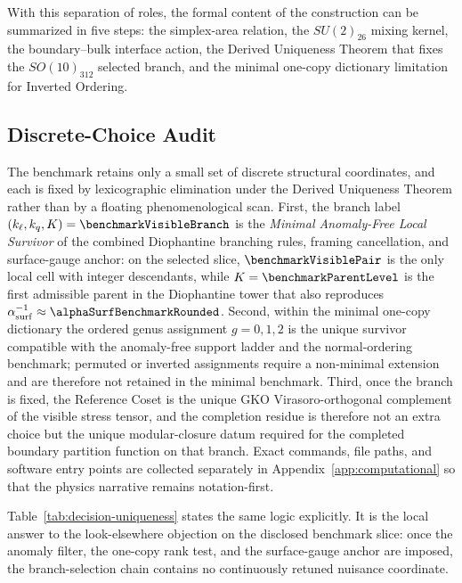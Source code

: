 \documentclass[11pt]{article}
\begin{document}
With this separation of roles, the formal content of the construction can be summarized in five steps: the simplex-area relation, the $SU(2)_{26}$ mixing kernel, the boundary--bulk interface action, the Derived Uniqueness Theorem that fixes the $SO(10)_{312}$ selected branch, and the minimal one-copy dictionary limitation for Inverted Ordering.

\subsection*{Discrete-Choice Audit}

The benchmark retains only a small set of discrete structural coordinates, and each is fixed by lexicographic elimination under the Derived Uniqueness Theorem rather than by a floating phenomenological scan. First, the branch label $(k_{\ell},k_q,K)=\benchmarkVisibleBranch$ is the \emph{Minimal Anomaly-Free Local Survivor} of the combined Diophantine branching rules, framing cancellation, and surface-gauge anchor: on the selected slice, $\benchmarkVisiblePair$ is the only local cell with integer descendants, while $K=\benchmarkParentLevel$ is the first admissible parent in the Diophantine tower that also reproduces $\alpha^{-1}_{\rm surf}\approx\alphaSurfBenchmarkRounded$. Second, within the minimal one-copy dictionary the ordered genus assignment $g=0,1,2$ is the unique survivor compatible with the anomaly-free support ladder and the normal-ordering benchmark; permuted or inverted assignments require a non-minimal extension and are therefore not retained in the minimal benchmark. Third, once the branch is fixed, the Reference Coset is the unique GKO Virasoro-orthogonal complement of the visible stress tensor, and the completion residue is therefore not an extra choice but the unique modular-closure datum required for the completed boundary partition function on that branch. Exact commands, file paths, and software entry points are collected separately in Appendix~\ref{app:computational} so that the physics narrative remains notation-first.

Table~\ref{tab:decision-uniqueness} states the same logic explicitly. It is the local answer to the look-elsewhere objection on the disclosed benchmark slice: once the anomaly filter, the one-copy rank test, and the surface-gauge anchor are imposed, the branch-selection chain contains no continuously retuned nuisance coordinate.
\end{document}
